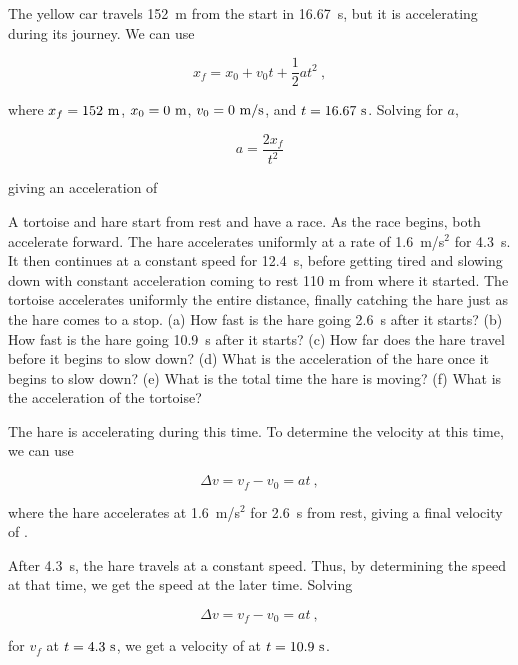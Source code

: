 \documentclass[]{flipit}
\begin{document}
\begin{enumi}
    \item The yellow car travels 152~m from the start in 16.67~s, but it is accelerating during its journey.
    We can use 
    
    \[x_f = x_0 + v_0t + \frac12 at^2~,\]

    where $x_f = 152~{\rm m}$, $x_0=0~{\rm m}$, $v_0=0~{\rm m/s}$, and $t=16.67~{\rm s}$.
    Solving for $a$,

    \[a = \frac{2x_f}{t^2} \]

    giving an acceleration of 
\end{enumi}

\begin{question}
    \item A tortoise and hare start from rest and have a race. As the race begins, both accelerate forward. The hare accelerates uniformly at a rate of 1.6~m/s$^2$ for 4.3~s. It then continues at a constant speed for 12.4~s, before getting tired and slowing down with constant acceleration coming to rest 110 m from where it started. The tortoise accelerates uniformly the entire distance, finally catching the hare just as the hare comes to a stop. (a) How fast is the hare going 2.6~s after it starts? (b) How fast is the hare going 10.9~s after it starts? (c) How far does the hare travel before it begins to slow down? (d) What is the acceleration of the hare once it begins to slow down? (e) What is the total time the hare is moving? (f) What is the acceleration of the tortoise?
\end{question}

\begin{enumi}
    \item The hare is accelerating during this time. 
    To determine the velocity at this time, we can use
    
    \[\Delta v = v_f - v_0 = at~,\]

    where the hare accelerates at 1.6~{m/s}$^2$ for 2.6~{s} from rest, giving a final velocity of .

    \item After 4.3~{s}, the hare travels at a constant speed.
    Thus, by determining the speed at that time, we get the speed at the later time.
    Solving

    \[\Delta v = v_f - v_0 = a t~,\]

    for $v_f$ at $t = 4.3~{\rm s}$, we get a velocity of  at $t=10.9~{\rm s}$.
\end{enumi}
\end{document}
